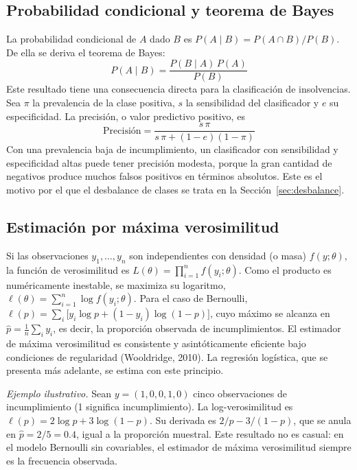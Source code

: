 \subsection{Probabilidad condicional y teorema de Bayes}
La probabilidad condicional de $A$ dado $B$ es $P(A\mid B)=P(A\cap B)/P(B)$. De ella se deriva el teorema de Bayes:
\begin{equation}
P(A\mid B) = \frac{P(B\mid A)\,P(A)}{P(B)}
\label{eq:bayes}
\end{equation}
Este resultado tiene una consecuencia directa para la clasificación de insolvencias. Sea $\pi$ la prevalencia de la clase positiva, $s$ la sensibilidad del clasificador y $e$ su especificidad. La precisión, o valor predictivo positivo, es
\begin{equation}
\text{Precisión} = \frac{s\,\pi}{s\,\pi + (1-e)(1-\pi)}
\label{eq:precision_bayes}
\end{equation}
Con una prevalencia baja de incumplimiento, un clasificador con sensibilidad y especificidad altas puede tener precisión modesta, porque la gran cantidad de negativos produce muchos falsos positivos en términos absolutos. Este es el motivo por el que el desbalance de clases se trata en la Sección~\ref{sec:desbalance}.

\subsection{Estimación por máxima verosimilitud}
Si las observaciones $y_1,\dots,y_n$ son independientes con densidad (o masa) $f(y;\theta)$, la función de verosimilitud es $L(\theta)=\prod_{i=1}^n f(y_i;\theta)$. Como el producto es numéricamente inestable, se maximiza su logaritmo, $\ell(\theta)=\sum_{i=1}^n \log f(y_i;\theta)$. Para el caso de Bernoulli, $\ell(p)=\sum_i\big[y_i\log p+(1-y_i)\log(1-p)\big]$, cuyo máximo se alcanza en $\hat{p}=\frac{1}{n}\sum_i y_i$, es decir, la proporción observada de incumplimientos. El estimador de máxima verosimilitud es consistente y asintóticamente eficiente bajo condiciones de regularidad (Wooldridge, 2010). La regresión logística, que se presenta más adelante, se estima con este principio.

\textit{Ejemplo ilustrativo.} Sean $y=(1,0,0,1,0)$ cinco observaciones de incumplimiento (1 significa incumplimiento). La log-verosimilitud es $\ell(p)=2\log p+3\log(1-p)$. Su derivada es $2/p-3/(1-p)$, que se anula en $\hat{p}=2/5=0.4$, igual a la proporción muestral. Este resultado no es casual: en el modelo Bernoulli sin covariables, el estimador de máxima verosimilitud siempre es la frecuencia observada.

